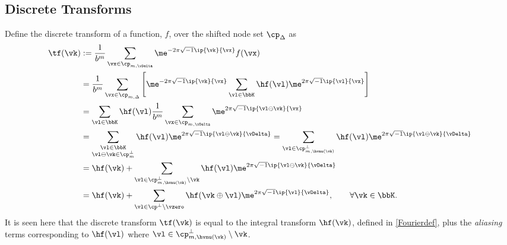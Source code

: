 \documentclass[]{elsarticle}
\theoremstyle{definition}
\begin{document}
\subsection{Discrete Transforms}
Define the discrete transform of a function, $f$, over the shifted node set $\cp_{\Delta}$ as 
\begin{align}
\label{tfdef}
\tf(\vk) 
&:= \frac{1}{b^m} \sum_{\vx \in \cp_{m,\vDelta}} \me^{-2 \pi \sqrt{-1} \ip{\vk}{\vx}} f(\vx) \\
\nonumber
&= \frac{1}{b^m}  \sum_{\vx \in \cp_{m,\Delta}} \left[\me^{-2 \pi \sqrt{-1} \ip{\vk}{\vx}}\sum_{\vl \in \bbK} \hf(\vl) \me^{2 \pi \sqrt{-1} \ip{\vl}{\vx}} \right] \\
\nonumber
& = \sum_{\vl \in \bbK} \hf(\vl)  \frac{1}{b^m}  \sum_{\vx \in \cp_{m,\vDelta}}  \me^{2 \pi \sqrt{-1} \ip{\vl \ominus \vk}{\vx}} \\
\nonumber
& = \sum_{\substack{\vl \in \bbK \\ \vl \ominus \vk \in \cp_m^{\perp}}} \hf(\vl) \me^{2 \pi \sqrt{-1} \ip{\vl \ominus \vk}{\vDelta}}= \sum_{\vl \in \cp_{m,\hvnu(\vk)}^{\perp}} \hf(\vl) \me^{2 \pi \sqrt{-1} \ip{\vl \ominus \vk}{\vDelta}} \\
\nonumber
&= \hf(\vk) + \sum_{\vl \in \cp_{m,\hvnu(\vk)}^{\perp}\setminus\vk} \hf(\vl) \me^{2 \pi \sqrt{-1} \ip{\vl \ominus \vk}{\vDelta}}\\
&= \hf(\vk) + \sum_{\vl \in \cp^{\perp}\setminus \vzero} \hf(\vk\oplus\vl) \me^{2 \pi \sqrt{-1} \ip{\vl}{\vDelta}}, \qquad \forall \vk \in \bbK. \label{tfassum}
\end{align}
It is seen here that the discrete transform $\tf(\vk)$ is equal to the integral transform $\hf(\vk)$, defined in \eqref{Fourierdef}, plus the \emph{aliasing} terms corresponding to $\hf(\vl)$ where $\vl \in \cp_{m,\hvnu(\vk)}^{\perp}\setminus \vk$.
\end{document}
